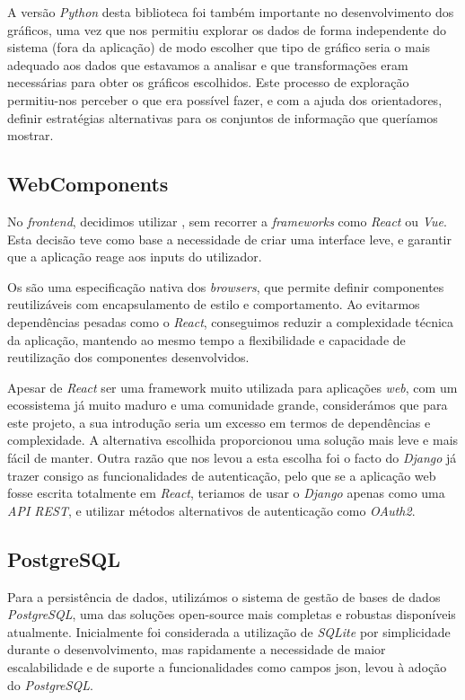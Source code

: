A versão \textit{Python} desta biblioteca foi também importante no desenvolvimento dos gráficos, uma vez que nos permitiu explorar os dados de forma independente do sistema (fora da aplicação) de modo escolher que tipo de gráfico seria o mais adequado aos dados que estavamos a analisar e que transformações eram necessárias para obter os gráficos escolhidos. Este processo de exploração permitiu-nos perceber o que era possível fazer, e com a ajuda dos orientadores, definir estratégias alternativas para os conjuntos de informação que queríamos mostrar.

\subsection{WebComponents}

No \textit{frontend}, decidimos utilizar \textit{\cite{webcomponents}}, sem recorrer a \textit{frameworks} como \textit{React} ou \textit{Vue}. Esta decisão teve como base a necessidade de criar uma interface leve, e garantir que a aplicação reage aos inputs do utilizador. 

Os \textit{\cite{webcomponents}} são uma especificação nativa dos \textit{browsers}, que permite definir componentes reutilizáveis com encapsulamento de estilo e comportamento. Ao evitarmos dependências pesadas como o \textit{React}, conseguimos reduzir a complexidade técnica da aplicação, mantendo ao mesmo tempo a flexibilidade e capacidade de reutilização dos componentes desenvolvidos.

Apesar de \textit{React} ser uma framework muito utilizada para aplicações \textit{web},  com um ecossistema já muito maduro e uma comunidade grande, considerámos que para este projeto, a sua introdução seria um excesso em termos de dependências e complexidade. A alternativa escolhida proporcionou uma solução mais leve e mais fácil de manter. Outra razão que nos levou a esta escolha foi o facto do \textit{Django} já trazer consigo as funcionalidades de autenticação, pelo que se a aplicação web fosse escrita totalmente em \textit{React}, teriamos de usar o \textit{Django} apenas como uma \textit{API REST}, e utilizar métodos alternativos de autenticação como \textit{OAuth2}.

\subsection{PostgreSQL}

Para a persistência de dados, utilizámos o sistema de gestão de bases de dados \textit{PostgreSQL}, uma das soluções open-source mais completas e robustas disponíveis atualmente. Inicialmente foi considerada a utilização de \textit{SQLite} por simplicidade durante o desenvolvimento, mas rapidamente a necessidade de maior escalabilidade e de suporte a funcionalidades como campos \gls{json}, levou à adoção do \textit{PostgreSQL}.

